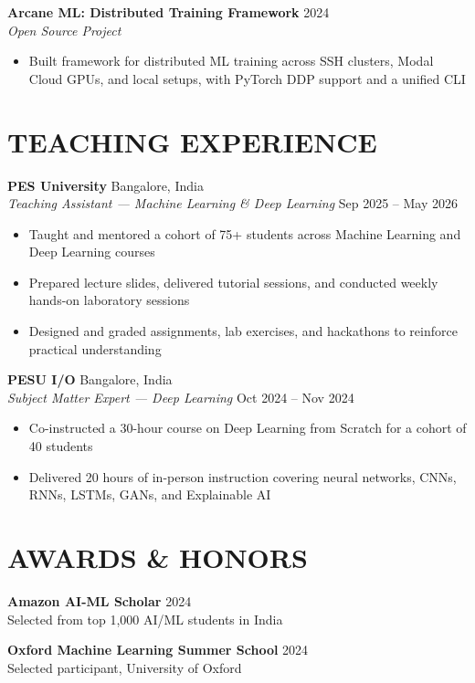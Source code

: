 \documentclass[a4paper,9pt]{extarticle}
\begin{document}
\noindent
\textbf{Arcane ML: Distributed Training Framework} \hfill 2024\\
\textit{Open Source Project}
\begin{itemize}
    \item Built framework for distributed ML training across SSH clusters, Modal Cloud GPUs, and local setups, with PyTorch DDP support and a unified CLI
\end{itemize}

\section*{TEACHING EXPERIENCE}
\noindent
\textbf{PES University} \hfill Bangalore, India\\
\textit{Teaching Assistant — Machine Learning \& Deep Learning} \hfill Sep 2025 -- May 2026
\begin{itemize}
    \item Taught and mentored a cohort of 75+ students across Machine Learning and Deep Learning courses
    \item Prepared lecture slides, delivered tutorial sessions, and conducted weekly hands-on laboratory sessions
    \item Designed and graded assignments, lab exercises, and hackathons to reinforce practical understanding
\end{itemize}

\noindent
\textbf{PESU I/O} \hfill Bangalore, India\\
\textit{Subject Matter Expert — Deep Learning} \hfill Oct 2024 -- Nov 2024
\begin{itemize}
    \item Co-instructed a 30-hour course on Deep Learning from Scratch for a cohort of 40 students
    \item Delivered 20 hours of in-person instruction covering neural networks, CNNs, RNNs, LSTMs, GANs, and Explainable AI
\end{itemize}

\section*{AWARDS \& HONORS}
\noindent
\textbf{Amazon AI-ML Scholar} \hfill 2024\\
Selected from top 1,000 AI/ML students in India

\medskip
\noindent
\textbf{Oxford Machine Learning Summer School} \hfill 2024\\
Selected participant, University of Oxford
\end{document}
